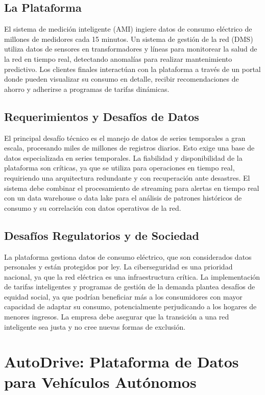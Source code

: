 \documentclass[12pt]{article}
\begin{document}
\subsection{La Plataforma}
El sistema de medición inteligente (AMI) ingiere datos de consumo eléctrico de millones de medidores cada 15 minutos. Un sistema de gestión de la red (DMS) utiliza datos de sensores en transformadores y líneas para monitorear la salud de la red en tiempo real, detectando anomalías para realizar mantenimiento predictivo. Los clientes finales interactúan con la plataforma a través de un portal donde pueden visualizar su consumo en detalle, recibir recomendaciones de ahorro y adherirse a programas de tarifas dinámicas.

\subsection{Requerimientos y Desafíos de Datos}
El principal desafío técnico es el manejo de datos de series temporales a gran escala, procesando miles de millones de registros diarios. Esto exige una base de datos especializada en series temporales. La fiabilidad y disponibilidad de la plataforma son críticas, ya que se utiliza para operaciones en tiempo real, requiriendo una arquitectura redundante y con recuperación ante desastres. El sistema debe combinar el procesamiento de streaming para alertas en tiempo real con un data warehouse o data lake para el análisis de patrones históricos de consumo y su correlación con datos operativos de la red.

\subsection{Desafíos Regulatorios y de Sociedad}
La plataforma gestiona datos de consumo eléctrico, que son considerados datos personales y están protegidos por ley. La ciberseguridad es una prioridad nacional, ya que la red eléctrica es una infraestructura crítica. La implementación de tarifas inteligentes y programas de gestión de la demanda plantea desafíos de equidad social, ya que podrían beneficiar más a los consumidores con mayor capacidad de adaptar su consumo, potencialmente perjudicando a los hogares de menores ingresos. La empresa debe asegurar que la transición a una red inteligente sea justa y no cree nuevas formas de exclusión.

\newpage

\section{AutoDrive: Plataforma de Datos para Vehículos Autónomos}
\end{document}
